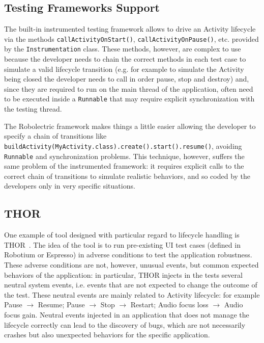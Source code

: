 \documentclass[11pt,a4paper,notitlepage]{article}
\begin{document}
\subsection{Testing Frameworks Support}
The built-in instrumented testing framework allows to drive an Activity lifecycle via the methods \texttt{callActivityOnStart()}, \texttt{callActivityOnPause()}, etc. provided by the \texttt{Instrumentation} class. These methods, however, are complex to use because the developer needs to chain the correct methods in each test case to simulate a valid lifecycle transition (e.g. for example to simulate the Activity being closed the developer needs to call in order pause, stop and destroy) and, since they are required to run on the main thread of the application, often need to be executed inside a \texttt{Runnable} that may require explicit synchronization with the testing thread.

The Robolectric framework makes things a little easier allowing the developer to specify a chain of transitions like \texttt{buildActivity(MyActivity.class).create().start().resume()}, avoiding \texttt{Runnable} and synchronization problems. This technique, however, suffers the same problem of the instrumented framework: it requires explicit calls to the correct chain of transitions to simulate realistic behaviors, and so coded by the developers only in very specific situations.

\subsection{THOR}
One example of tool designed with particular regard to lifecycle handling is THOR~\cite{Adamsen:2015:SEA:2771783.2771786}. The idea of the tool is to run pre-existing UI test cases (defined in Robotium or Espresso) in adverse conditions to test the application robustness. These adverse conditions are not, however, unusual events, but common expected behaviors of the application: in particular, THOR injects in the tests several neutral system events, i.e. events that are not expected to change the outcome of the test. These neutral events are mainly related to Activity lifecycle: for example Pause $\rightarrow$ Resume; Pause $\rightarrow$ Stop $\rightarrow$ Restart; Audio
focus loss $\rightarrow$ Audio focus gain. Neutral events injected in an application that does not manage the lifecycle correctly can lead to the discovery of bugs, which are not necessarily crashes but also unexpected behaviors for the specific application.
\end{document}
